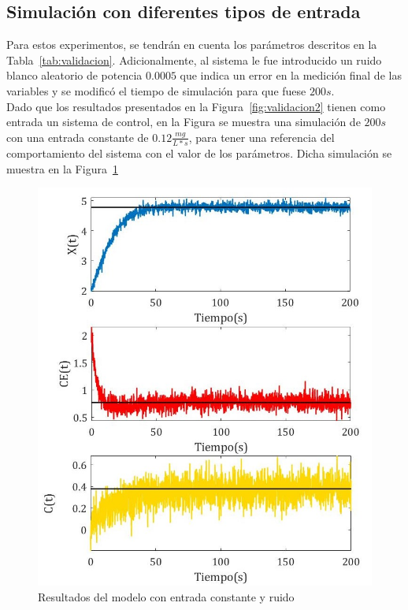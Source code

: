 \subsection{Simulación con diferentes tipos de entrada}
\label{sec:inputs}
Para estos experimentos, se tendrán en cuenta los parámetros descritos en la Tabla~\ref{tab:validacion}. Adicionalmente, al sistema le fue introducido un ruido blanco aleatorio de potencia $0.0005$ que indica un error en la medición final de las variables y se modificó el tiempo de simulación para que fuese $200s$. \\
Dado que los resultados presentados en la Figura~\ref{fig:validacion2} tienen como entrada un sistema de control, en la Figura se muestra una simulación de $200s$ con una entrada constante de $0.12\frac{mg}{L*s}$, para tener una referencia del comportamiento del sistema con el valor de los parámetros. Dicha simulación se muestra en la Figura~\ref{fig:entrada-constante} \\
\begin{figure}[th!]
\centering
\includegraphics[scale = 0.4]{entrada-constante1}
\caption{Resultados del modelo con entrada constante y ruido}
\label{fig:entrada-constante}
\end{figure}
